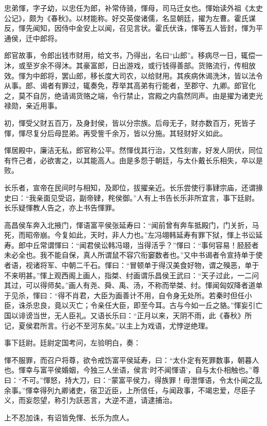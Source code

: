 \documentclass[]{article}
\begin{document}
忠弟惲，字子幼，以忠任为郎，补常侍骑，惲母，司马迁女也。惲始读外祖《太史公记》，颇为《春秋》。以材能称。好交英俊诸儒，名显朝廷，擢为左曹。霍氏谋反，惲先闻知，因侍中金安上以闻，召见言状。霍氏伏诛，惲等五人皆封，惲为平通侯，迁中郎将。

郎官故事，令郎出钱市财用，给文书，乃得出，名曰``山郎''。移病尽一日，辄偿一沐，或至岁余不得沐。其豪富郎，日出游戏，或行钱得善部。货赂流行，传相放效。惲为中郎将，罢山郎，移长度大司农，以给财用。其疾病休谒洗沐，皆以法令从事。郎、谒者有罪过，辄奏免，荐举其高弟有行能者，至郡守、九卿。郎官化之，莫不自厉，绝请谒货赂之端，令行禁止，宫殿之内翕然同声。由是擢为诸吏光禄勋，亲近用事。

初，惲受父财五百万，及身封侯，皆以分宗族。后母无子，财亦数百万，死皆子惲，惲尽复分后母昆弟。再受訾千余万，皆以分施。其轻财好义如此。

惲居殿中，廉洁无私，郎官称公平。然惲伐其行治，又性刻害，好发人阴伏，同位有忤己者，必欲害之，以其能高人。由是多怨于朝廷，与太仆戴长乐相失，卒以是败。

长乐者，宣帝在民间时与相知，及即位，拔擢亲近。长乐尝使行事肄宗庙，还谓掾史曰：``我亲面见受诏，副帝肄，秺侯御。''人有上书告长乐非所宜言，事下廷尉。长乐疑惲教人告之，亦上书告惲罪。

高昌侯车奔入北掖门，惲语富平侯张延寿曰：``闻前曾有奔车抵殿门，门关折，马死，而昭帝崩。今复如此，天时，非人力也。''左冯翊韩延寿有罪下狱，惲上书讼延寿。郎中丘常谓惲曰：``闻君侯讼韩冯翊，当得活乎？''惲曰：``事何容易！胫胫者未必全也。我不能自保，真人所谓鼠不容穴衔窭数者也。''又中书谒者令宣持单于使者语，视诸将军、中朝二千石。惲曰：``冒顿单于得汉美食好物，谓之殠恶，单于不来明甚。''惲上观西阁上画人，指桀、纣画谓乐昌侯王武曰：``天子过此，一二问其过，可以得师矣。''画人有尧、舜、禹、汤，不称而举桀、纣。惲闻匈奴降者道单于见杀，惲曰：``得不肖君，大臣为画善计不用，自令身无处所。若秦时但任小臣，诛杀忠良，竟以灭亡；令亲任大臣，即至今耳。古与今如一丘之貉。''惲妄引亡国以诽谤当世，无人臣礼。又语长乐曰：``正月以来，天阴不雨，此《春秋》所记，夏侯君所言。行必不至河东矣。''以主上为戏语，尤悖逆绝理。

事下廷尉。廷尉定国考问，左验明白，奏：

惲不服罪，而召户将尊，欲令戒饬富平侯延寿，曰：``太仆定有死罪数事，朝暮人也。惲幸与富平侯婚姻，今独三人坐语，侯言`时不闻惲语'，自与太仆相触也。''尊曰：``不可。''惲怒，持大刀，曰：``蒙富平侯力，得族罪！毋泄惲语，令太仆闻之乱余事。''惲幸得列九卿诸吏，宿卫近臣，上所信任，与闻政事，不竭忠爱，尽臣子义，而妄怨望，称引为訞恶言，大逆不道，请逮捕治。

上不忍加诛，有诏皆免惲、长乐为庶人。
\end{document}

